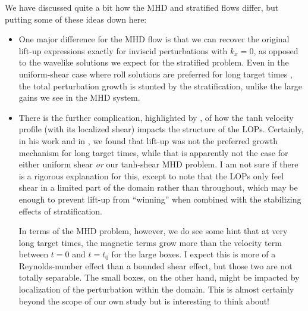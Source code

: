 \documentclass{article}
\begin{document}
We have discussed quite a bit how the MHD and stratified flows differ, but putting some of these ideas down here:
\begin{itemize}
	\item One major difference for the MHD flow is that we can recover the original lift-up expressions exactly for inviscid perturbations with $k_x=0$, as opposed to the wavelike solutions we expect for the stratified problem. Even in the uniform-shear case where roll solutions are preferred for long target times \citep{Farrell1993b,Bakas2001,Tearle2004}, the total perturbation growth is stunted by the stratification, unlike the large gains we see in the MHD system. 
	\item There is the further complication, highlighted by \citet{Tearle2004}, of how the tanh velocity profile (with its localized shear) impacts the structure of the LOPs. Certainly, in his work and in \citet{Kaminski2014}, we found that lift-up was not the preferred growth mechanism for long target times, while that is apparently not the case for either uniform shear \emph{or} our tanh-shear MHD problem. I am not sure if there is a rigorous explanation for this, except to note that the LOPs only feel shear in a limited part of the domain rather than throughout, which may be enough to prevent lift-up from ``winning'' when combined with the stabilizing effects of stratification. 
	
	In terms of the MHD problem, however, we do see some hint that at very long target times, the magnetic terms grow more than the velocity term between $t=0$ and $t=t_0$ for the large boxes. I expect this is more of a Reynolds-number effect than a bounded shear effect, but those two are not totally separable. The small boxes, on the other hand, might be impacted by localization of the perturbation within the domain. This is almost certainly beyond the scope of our own study but is interesting to think about!
\end{itemize}




\end{document}
